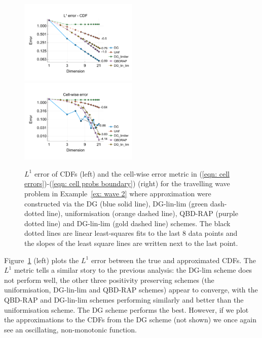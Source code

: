 \begin{example}
\begin{figure}[h]
	\centering
	\includegraphics[width=0.5\textwidth,trim={0.75cm 0.8cm 0.25cm 1.25cm},clip]{chapter6/figs/wave/fun2/meshs_l1_cdf_error_formatted.pdf}%
	\includegraphics[width=0.5\textwidth,trim={0.75cm 0.8cm 0.25cm 1.25cm},clip]{chapter6/figs/wave/fun2/L1_cell_probs.pdf} 
	\caption{\(L^1\) error of CDFs (left) and the cell-wise error metric in (\ref{eqn: cell errors})-(\ref{eqn: cell probs boundary}) (right) for the travelling wave problem in Example~\ref{ex: wave 2} where approximation were constructed via the DG (blue solid line), DG-lin-lim (green dash-dotted line), uniformisation (orange dashed line), QBD-RAP (purple dotted line) and DG-lin-lim (gold dashed line) schemes. The black dotted lines are linear least-squares fits to the last 8 data points and the slopes of the least square lines are written next to the last point.} 
	\label{fig: fun 2 wave} 
\end{figure}
Figure~\ref{fig: fun 2 wave} (left) plots the \(L^1\) error between the true and approximated CDFs. The \(L^1\) metric tells a similar story to the previous analysis: the DG-lim scheme does not perform well, the other three positivity preserving schemes (the uniformisation, DG-lin-lim and QBD-RAP schemes) appear to converge, with the QBD-RAP and DG-lin-lim schemes performing similarly and better than the uniformisation scheme. The DG scheme performs the best. However, if we plot the approximations to the CDFs from the DG scheme (not shown) we once again see an oscillating, non-monotonic function. 


\end{example}
